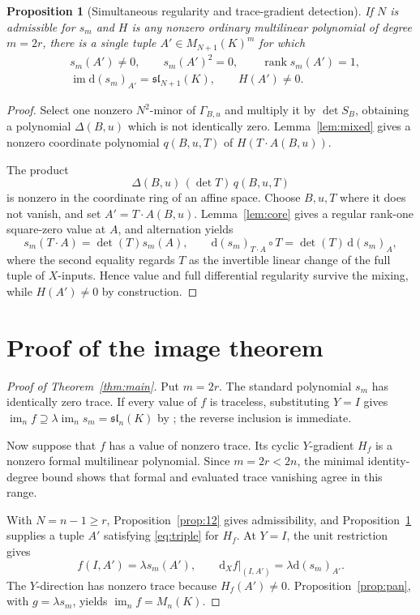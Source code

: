 \documentclass[11pt,reqno]{amsart}
\newcommand{\im}{\operatorname{im}}
\newcommand{\dd}{\mathrm d}
\theoremstyle{plain}
\newtheorem{proposition}[theorem]{Proposition}
\theoremstyle{definition}
\numberwithin{equation}{section}
\begin{document}
\begin{proposition}[Simultaneous regularity and trace-gradient detection]\label{prop:compat}
If $N$ is admissible for $s_m$ and $H$ is any nonzero ordinary multilinear polynomial of degree $m=2r$, there is a \emph{single} tuple $A'\in M_{N+1}(K)^m$ for which
\begin{equation}\label{eq:triple}
\begin{aligned}
 &s_m(A')\ne0,\qquad s_m(A')^2=0,\qquad
 \operatorname{rank}s_m(A')=1,\\
 &\im\dd(s_m)_{A'}=\mathfrak{sl}_{N+1}(K),\qquad H(A')\ne0.
\end{aligned}
\end{equation}
\end{proposition}
\begin{proof}
Select one nonzero $N^2$-minor of $\Gamma_{B,u}$ and multiply it by $\det S_B$, obtaining a polynomial $\Delta(B,u)$ which is not identically zero.  Lemma~\ref{lem:mixed} gives a nonzero coordinate polynomial $q(B,u,T)$ of $H(T\cdot A(B,u))$.\par{}
The product
\[
 \Delta(B,u)\,(\det T)\,q(B,u,T)
\]
is nonzero in the coordinate ring of an affine space.  Choose $B,u,T$ where it does not vanish, and set $A'=T\cdot A(B,u)$.  Lemma~\ref{lem:core} gives a regular rank-one square-zero value at $A$, and alternation yields
\[
 s_m(T\cdot A)=\det(T)s_m(A),\qquad
 \dd(s_m)_{T\cdot A}\circ T=\det(T)\,\dd(s_m)_A,
\]
where the second equality regards $T$ as the invertible linear change of the full tuple of $X$-inputs.  Hence value and full differential regularity survive the mixing, while $H(A')\ne0$ by construction.
\end{proof}

\section{Proof of the image theorem}\label{sec:mainproof}
\begin{proof}[Proof of Theorem~\ref{thm:main}]
Put $m=2r$.  The standard polynomial $s_m$ has identically zero trace.  If every value of $f$ is traceless, substituting $Y=I$ gives
$\im_n f\supseteq\lambda\im_n s_m=\mathfrak{sl}_n(K)$ by
\cite[Theorem~1.1]{Miah2026Standard}; the reverse inclusion is immediate.

Now suppose that $f$ has a value of nonzero trace.  Its cyclic
$Y$-gradient $H_f$ is a nonzero formal multilinear polynomial.  Since
$m=2r<2n$, the minimal identity-degree bound shows that formal and
evaluated trace vanishing agree in this range.

With $N=n-1\ge r$, Proposition~\ref{prop:12} gives admissibility, and
Proposition~\ref{prop:compat} supplies a tuple $A'$ satisfying
\eqref{eq:triple} for $H_f$.  At $Y=I$, the unit restriction gives
\[
 f(I,A')=\lambda s_m(A'),\qquad
 \dd_Xf\big|_{(I,A')}=\lambda\dd(s_m)_{A'}.
\]
The $Y$-direction has nonzero trace because $H_f(A')\ne0$.
Proposition~\ref{prop:pan}, with $g=\lambda s_m$, yields
$\im_n f=M_n(K)$.
\end{proof}
\end{document}
